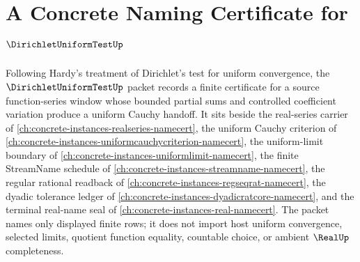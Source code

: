 \chapter{A Concrete Naming Certificate for $\DirichletUniformTestUp$}
\label{ch:concrete-instances-dirichlet-uniform-test-namecert}

Following Hardy's treatment of Dirichlet's test for uniform convergence, the $\DirichletUniformTestUp$ packet records a finite certificate for a source function-series window whose bounded partial sums and controlled coefficient variation produce a uniform Cauchy handoff. It sits beside the real-series carrier of \autoref{ch:concrete-instances-realseries-namecert}, the uniform Cauchy criterion of \autoref{ch:concrete-instances-uniformcauchycriterion-namecert}, the uniform-limit boundary of \autoref{ch:concrete-instances-uniformlimit-namecert}, the finite StreamName schedule of \autoref{ch:concrete-instances-streamname-namecert}, the regular rational readback of \autoref{ch:concrete-instances-regseqrat-namecert}, the dyadic tolerance ledger of \autoref{ch:concrete-instances-dyadicratcore-namecert}, and the terminal real-name seal of \autoref{ch:concrete-instances-real-namecert}. The packet names only displayed finite rows; it does not import host uniform convergence, selected limits, quotient function equality, countable choice, or ambient $\RealUp$ completeness.

